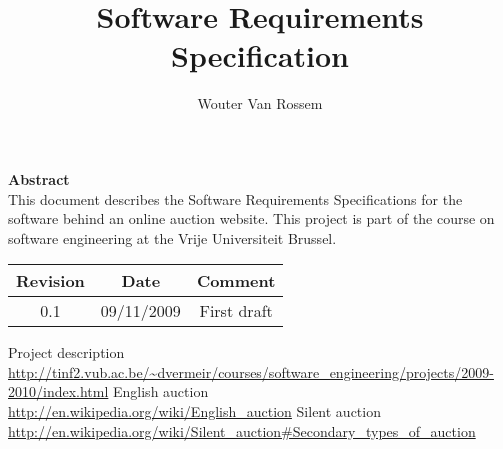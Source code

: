 \documentclass{report}
\begin{document}
\title{Software Requirements Specification}
\author{Wouter Van Rossem}

\maketitle
\begin{center}
	\textbf{Abstract} \\
	This document describes the Software Requirements Specifications for
	the software behind an online auction website. This project is part of 
	the course on software engineering at the Vrije Universiteit Brussel.
	\bigskip 
\begin{tabular}{|c|c|c|}
	\hline  \textbf{Revision} & \textbf{Date} & \textbf{Comment} \\ 
	\hline 0.1 & 09/11/2009 & First draft \\ 
	\hline 
\end{tabular} 
\end{center}
\tableofcontents








\begin{thebibliography}{9}
 Project description \\
	\url{http://tinf2.vub.ac.be/~dvermeir/courses/software_engineering/projects/2009-2010/index.html}
 English auction \\ 
	\url{http://en.wikipedia.org/wiki/English_auction}
 Silent auction \\
	\url{http://en.wikipedia.org/wiki/Silent_auction#Secondary_types_of_auction}
\end{thebibliography}

\end{document}
